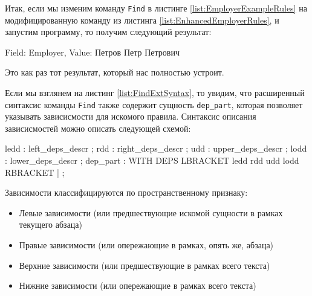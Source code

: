 Итак, если мы изменим команду \lstinline{Find} в листинге \ref{list:EmployerExampleRules} на модифицированную команду из листинга \ref{list:EnhancedEmployerRules}, и запустим программу, то получим следующий результат:
\begin{Verb}
Field: Employer, Value: Петров Петр Петрович
\end{Verb}
Это как раз тот результат, который нас полностью устроит.

Если мы взглянем на листинг \ref{list:FindExtSyntax}, то увидим, что расширенный синтаксис команды \lstinline{Find} также содержит сущность \lstinline{dep_part}, которая позволяет указывать зависисмости для искомого правила. Синтаксис описания зависисмостей можно описать следующей схемой:
\begin{Verb}
ledd
    : left_deps_descr
    ;
rdd
    : right_deps_descr
    ;
udd
    : upper_deps_descr
    ;
lodd
    : lower_deps_descr
    ;
dep_part
    : WITH DEPS LBRACKET ledd rdd udd lodd RBRACKET
    | %
    ;
\end{Verb}
Зависимости классифицируются по пространственному признаку: 
\begin{itemize}
  \item Левые зависимости (или предшествующие искомой сущности в рамках текущего абзаца)
  \item Правые зависимости (или опережающие в рамках, опять же, абзаца)
  \item Верхние зависимости (или предшествующие в рамках всего текста)
  \item Нижние зависимости (или опережающие в рамках всего текста)
\end{itemize}

